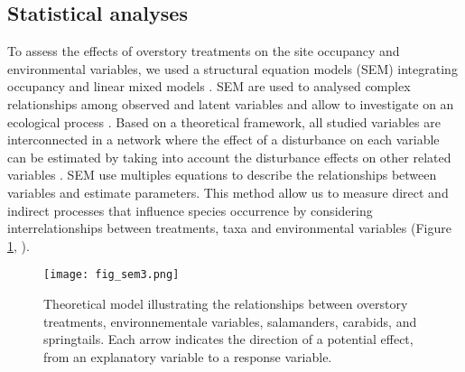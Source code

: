 \subsection*{Statistical analyses}
\label{subsec:analyses}

To assess the effects of overstory treatments on the site occupancy and environmental variables, we used a structural equation models (SEM) integrating occupancy and linear mixed models \citep{graceSpecificationStructuralEquation2010,josephIntegratingOccupancyModels2016,mackenzieOccupancyEstimationModeling2006a}.
SEM are used to analysed complex relationships among observed and latent variables and allow to investigate on an ecological process \citep{graceStructuralEquationModeling2008}.
Based on a theoretical framework, all studied variables are interconnected in a network where the effect of a disturbance on each variable can be estimated by taking into account 
the disturbance effects on other related variables \citep{graceStructuralEquationModeling2008}.
SEM use multiples equations to describe the relationships between variables and estimate parameters.
This method allow us to measure direct and indirect processes that influence species occurrence by considering interrelationships between treatments, taxa and environmental variables (Figure \ref*{fig:SEM}, \citealp{graceSpecificationStructuralEquation2010}).
\\

\begin{figure}[ht!]
	\centering
	\texttt{[image: fig\_sem3.png]}
	\caption[Theoretical model illustrating the relationships between overstory treatments, environmental variables and species groups.]{Theoretical model illustrating the relationships between overstory treatments, environnementale variables, salamanders, carabids, and springtails. 
  Each arrow indicates the direction of a potential effect, from an explanatory variable to a response variable.}
	\label{fig:SEM}
	\end{figure}  

